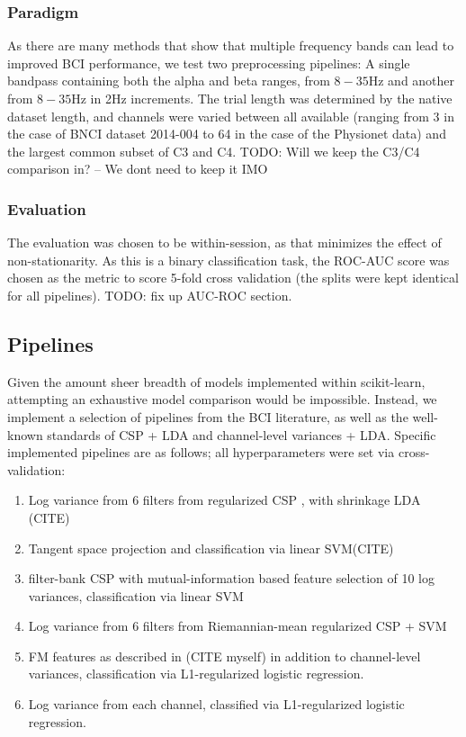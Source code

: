 \subsubsection{Paradigm}
As there are many methods that show that multiple frequency bands can lead to
improved BCI performance\cite{KaiKengAng2008}, we test two preprocessing
pipelines: A single bandpass containing both the alpha and beta ranges, from
$8-35\text{Hz}$ and another from $8-35\text{Hz}$ in 2Hz increments. The trial
length was determined by the native dataset length, and channels were varied
between all available (ranging from 3 in the case of BNCI dataset 2014-004 to 64
in the case of the Physionet data) and the largest common subset of C3 and C4.
TODO: Will we keep the C3/C4 comparison in? -- We dont need to keep it IMO

\subsubsection{Evaluation}
The evaluation was chosen to be within-session, as that minimizes the effect of non-stationarity. As this is a binary classification task, the ROC-AUC score was chosen as the metric to score 5-fold cross validation (the splits were kept identical for all pipelines). 
TODO: fix up AUC-ROC section.
\subsection{Pipelines}

Given the amount sheer breadth of models implemented within scikit-learn,
attempting an exhaustive model comparison would be impossible. Instead, we
implement a selection of pipelines from the BCI literature, as well as the
well-known standards of CSP + LDA and channel-level variances + LDA. Specific
implemented pipelines are as follows; all hyperparameters were set via cross-validation:
\begin{enumerate}
  
\item Log variance from 6 filters from regularized CSP \cite{Lotte2011}, with shrinkage LDA (CITE)
\item Tangent space projection and classification via linear SVM(CITE)
\item filter-bank CSP with mutual-information based feature selection of 10 log variances, classification via linear SVM \cite{KaiKengAng2008}
\item Log variance from 6 filters from Riemannian-mean regularized CSP + SVM
\item FM features as described in (CITE myself) in addition to channel-level variances, classification via L1-regularized logistic regression. 
\item Log variance from each channel, classified via L1-regularized logistic regression.
\end{enumerate}

